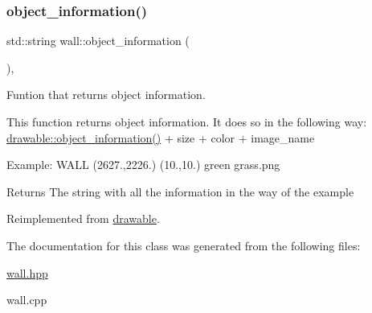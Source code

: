 \mbox{\label{classwall_aab1de4f144f176b134a967ba08747932}} 
\subsubsection{\texorpdfstring{object\+\_\+information()}{object\_information()}}
{\footnotesize\ttfamily std\+::string wall\+::object\+\_\+information (\begin{DoxyParamCaption}{ }\end{DoxyParamCaption})\hspace{0.3cm}{\ttfamily [override]}, {\ttfamily [virtual]}}



Funtion that returns object information. 

This function returns object information. It does so in the following way\+: \hyperlink{classdrawable_a2ed0f8bb53f33477f7722efa7bb24583}{drawable\+::object\+\_\+information()} + size + color + image\+\_\+name

Example\+: W\+A\+LL (2627.,2226.) (10.,10.) green grass.\+png

\begin{DoxyReturn}{Returns}
The string with all the information in the way of the example 
\end{DoxyReturn}


Reimplemented from \hyperlink{classdrawable_a2ed0f8bb53f33477f7722efa7bb24583}{drawable}.



The documentation for this class was generated from the following files\+:\begin{DoxyCompactItemize}
\item 
\hyperlink{wall_8hpp}{wall.\+hpp}\item 
wall.\+cpp\end{DoxyCompactItemize}
